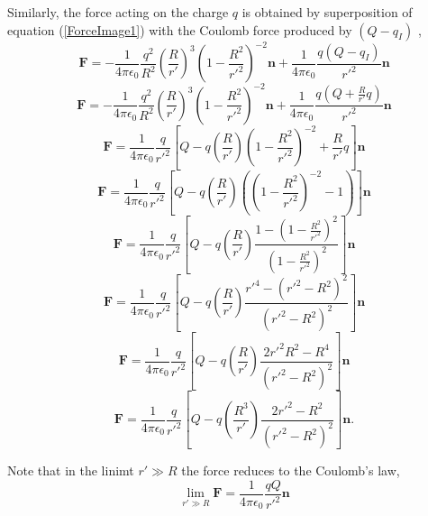 Similarly, the force acting on the charge $q$ is obtained by superposition of equation (\ref{ForceImage1}) with the Coulomb  force produced by $(Q-q_I)$ ,
\begin{equation}
\textbf{F} = -\frac{1}{4\pi \epsilon_0} \frac{q^2}{R^2}  \left( \frac{R}{r'}  \right)^3 \left( 1 - \frac{R^2}{r'^2}\right)^{-2} \textbf{n} + \frac{1}{4\pi \epsilon_0} \frac{q(Q-q_I)}{r'^2} \textbf{n}
\end{equation}
\begin{equation}
\textbf{F} = - \frac{1}{4\pi \epsilon_0} \frac{q^2}{R^2}  \left( \frac{R}{r'}  \right)^3 \left( 1 - \frac{R^2}{r'^2}\right)^{-2} \textbf{n} + \frac{1}{4\pi \epsilon_0} \frac{q(Q+ \frac{R}{r'}q)}{r'^2} \textbf{n}
\end{equation}
\begin{equation}
\textbf{F} = \frac{1}{4\pi \epsilon_0}  \frac{q}{r'^2} \left[Q - q \left( \frac{R}{r'}  \right) \left( 1 - \frac{R^2}{r'^2}\right)^{-2} + \frac{R}{r'}q \right] \textbf{n}
\end{equation}
\begin{equation}
\textbf{F} = \frac{1}{4\pi \epsilon_0}  \frac{q}{r'^2} \left[Q - q \left( \frac{R}{r'}  \right) \left(   \left( 1 - \frac{R^2}{r'^2}\right)^{-2} -1 \right) \right] \textbf{n}
\end{equation}
\begin{equation}
\textbf{F} = \frac{1}{4\pi \epsilon_0}  \frac{q}{r'^2} \left[ Q - q \left( \frac{R}{r'} \right)  \frac{1 - \left(1 - \frac{R^2}{r'^2}\right)^{2} }{ \left( 1 - \frac{R^2}{r'^2}\right)^2 }   \right] \textbf{n}
\end{equation}
\begin{equation}
\textbf{F}= \frac{1}{4\pi \epsilon_0}  \frac{q}{r'^2} \left[ Q - q \left( \frac{R}{r'} \right)  \frac{r'^4 - \left(r'^2 - R^2 \right)^{2} }{ \left( r'^2 - R^2 \right)^2 }   \right] \textbf{n}
\end{equation}
\begin{equation}
\textbf{F}= \frac{1}{4\pi \epsilon_0}  \frac{q}{r'^2} \left[ Q - q \left( \frac{R}{r'} \right)  \frac{ 2 r'^2 R^2 - R^4  }{ \left( r'^2 - R^2 \right)^2 }   \right] \textbf{n}
\end{equation}
\begin{equation}
\textbf{F}= \frac{1}{4\pi \epsilon_0}  \frac{q}{r'^2} \left[ Q - q \left( \frac{R^3}{r'} \right)  \frac{ 2 r'^2 - R^2  }{ \left( r'^2 - R^2 \right)^2 }   \right] \textbf{n}.
\end{equation}

Note that in the linimt $r' \gg R$ the force reduces to the Coulomb's law,
\begin{equation}
\lim_{r' \gg R} \textbf{F}  =  \frac{1}{4\pi \epsilon_0}  \frac{qQ}{r'^2} \textbf{n}
\end{equation}

